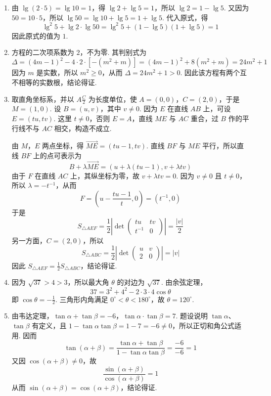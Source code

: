 \documentclass[UTF8,a4paper,oneside,11pt]{ctexbook}
\begin{document}
\begin{solution}
\begin{enumerate}
\item 由 \(\lg\left(2\cdot5\right)=\lg10=1\)，得 \(\lg2+\lg5=1\)，所以 \(\lg2=1-\lg5\). 又因为 \(50=10\cdot5\)，所以 \(\lg50=\lg10+\lg5=1+\lg5\). 代入原式，得
\[
\lg^{2}5+\lg2\cdot\lg50=\lg^{2}5+\left(1-\lg5\right)\left(1+\lg5\right)=1
\]
因此原式的值为 \(1\).

\item 方程的二次项系数为 \(2\)，不为零. 其判别式为
\[
\Delta=\left(4m-1\right)^{2}-4\cdot2\cdot\left[-\left(m^{2}+m\right)\right]=\left(4m-1\right)^{2}+8\left(m^{2}+m\right)=24m^{2}+1
\]
因为 \(m\) 是实数，所以 \(m^{2}\geq0\)，从而 \(\Delta=24m^{2}+1>0\). 因此该方程有两个互不相等的实数根，结论得证.

\item 取直角坐标系，并以 \(A\frac{C}{2}\) 为长度单位，使 \(A=(0,0)\)，\(C=(2,0)\)，于是 \(M=(1,0)\). 设 \(B=(u,v)\)，其中 \(v\ne0\). 因为 \(E\) 在直线 \(AB\) 上，可设 \(E=(tu,tv)\). 这里 \(t\ne0\)，否则 \(E=A\)，直线 \(ME\) 与 \(AC\) 重合，过 \(B\) 作的平行线不与 \(AC\) 相交，构造不成立.

由 \(M\)，\(E\) 两点坐标，得 \(\overrightarrow{ME}=(tu-1,tv)\). 直线 \(BF\) 与 \(ME\) 平行，所以直线 \(BF\) 上的点可表示为
\[
B+\lambda\overrightarrow{ME}=\left(u+\lambda\left(tu-1\right),v+\lambda tv\right)
\]
由于 \(F\) 在直线 \(AC\) 上，其纵坐标为零，故 \(v+\lambda tv=0\). 因为 \(v\ne0\) 且 \(t\ne0\)，所以 \(\lambda=-t^{-1}\)，从而
\[
F=\left(u-\frac{tu-1}{t},0\right)=\left(t^{-1},0\right)
\]
于是
\[
S_{\triangle AEF}=\frac{1}{2}\left|\det\begin{pmatrix}tu&tv\\ t^{-1}&0\end{pmatrix}\right|=\frac{|v|}{2}
\]
另一方面，\(C=(2,0)\)，所以
\[
S_{\triangle ABC}=\frac{1}{2}\left|\det\begin{pmatrix}u&v\\ 2&0\end{pmatrix}\right|=|v|
\]
因此 \(S_{\triangle AEF}=\frac{1}{2}S_{\triangle ABC}\)，结论得证.

\item 因为 \(\sqrt{37}>4>3\)，所以最大角 \(\theta\) 的对边为 \(\sqrt{37}\). 由余弦定理，
\[
37=3^{2}+4^{2}-2\cdot3\cdot4\cos\theta
\]
即 \(\cos\theta=-\frac{1}{2}\). 三角形内角满足 \(0^{\circ}<\theta<180^{\circ}\)，故 \(\theta=120^{\circ}\).

\item 由韦达定理，\(\tan\alpha+\tan\beta=-6\)，\(\tan\alpha\cdot\tan\beta=7\). 题设说明 \(\tan\alpha\)、\(\tan\beta\) 有定义，且 \(1-\tan\alpha\tan\beta=1-7=-6\ne0\)，所以正切和角公式适用. 因而
\[
\tan\left(\alpha+\beta\right)=\frac{\tan\alpha+\tan\beta}{1-\tan\alpha\tan\beta}=\frac{-6}{-6}=1
\]
又因 \(\cos\left(\alpha+\beta\right)\ne0\)，故
\[
\frac{\sin\left(\alpha+\beta\right)}{\cos\left(\alpha+\beta\right)}=1
\]
从而 \(\sin\left(\alpha+\beta\right)=\cos\left(\alpha+\beta\right)\)，结论得证.
\end{enumerate}
\end{solution}
\end{document}
